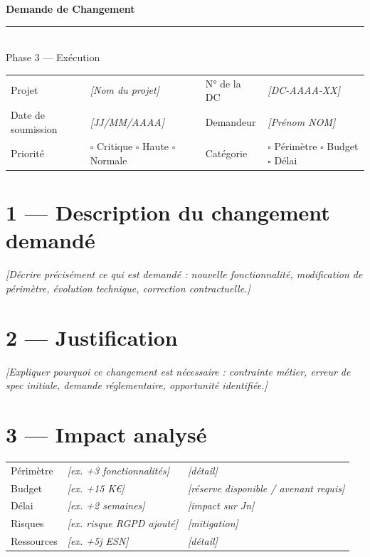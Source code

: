 \documentclass[11pt,a4paper,oneside]{report}
\begin{document}
\small

\begin{center}
{\LARGE\bfseries\color{cnNavy} Demande de Changement}\\[4pt]
\textcolor{cnOrange}{\rule{10cm}{1pt}}\\[4pt]
{\large\color{cnSlate} Phase 3 — Exécution}
\end{center}

\vspace{6pt}
\renewcommand{\arraystretch}{1.4}
\begin{tabularx}{\textwidth}{L{3.5cm} Y L{3.5cm} Y}
\toprule
{} &  &  &  \\
\midrule
Projet                & \textit{[Nom du projet]} & N° de la DC & \textit{[DC-AAAA-XX]} \\
Date de soumission    & \textit{[JJ/MM/AAAA]}    & Demandeur   & \textit{[Prénom NOM]} \\
Priorité              & $\square$ Critique \quad $\square$ Haute \quad $\square$ Normale & Catégorie & $\square$ Périmètre \quad $\square$ Budget \quad $\square$ Délai \\
\bottomrule
\end{tabularx}

\section*{1 — Description du changement demandé}

\textit{[Décrire précisément ce qui est demandé : nouvelle fonctionnalité, modification de périmètre, évolution technique, correction contractuelle.]}

\section*{2 — Justification}

\textit{[Expliquer pourquoi ce changement est nécessaire : contrainte métier, erreur de spec initiale, demande réglementaire, opportunité identifiée.]}

\section*{3 — Impact analysé}

\renewcommand{\arraystretch}{1.3}
\begin{tabularx}{\textwidth}{L{3cm} Y Y}
\toprule
{} &  &  \\
\midrule
Périmètre & \textit{[ex. +3 fonctionnalités]} & \textit{[détail]} \\
Budget    & \textit{[ex. +15 K€]}             & \textit{[réserve disponible / avenant requis]} \\
Délai     & \textit{[ex. +2 semaines]}         & \textit{[impact sur Jn]} \\
Risques   & \textit{[ex. risque RGPD ajouté]} & \textit{[mitigation]} \\
Ressources & \textit{[ex. +5j ESN]}            & \textit{[détail]} \\
\bottomrule
\end{tabularx}
\end{document}
